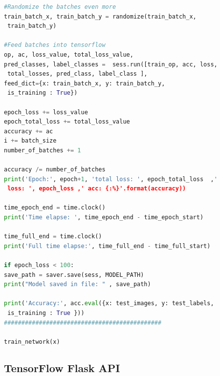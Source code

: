 \begin{lstlisting}[language=python, frame=single]
#Randomize the batches even more
train_batch_x, train_batch_y = randomize(train_batch_x,
 train_batch_y)

#Feed batches into tensorflow
op, ac, loss_value, total_loss_value, 
pred_classes, label_classes =  sess.run([train_op, acc, loss,
 total_losses, pred_class, label_class ],
feed_dict={x: train_batch_x, y: train_batch_y,
 is_training : True})

epoch_loss += loss_value
epoch_total_loss += total_loss_value
accuracy += ac
i += batch_size
number_of_batches += 1

accuracy /= number_of_batches       
print('Epoch:', epoch+1, 'total loss: ', epoch_total_loss  ,'
 loss: ', epoch_loss ,' acc: {:%}'.format(accuracy))

time_epoch_end = time.clock()
print('Time elapse: ', time_epoch_end - time_epoch_start)

time_full_end = time.clock()
print('Full time elapse:', time_full_end - time_full_start)

if epoch_loss < 100:
save_path = saver.save(sess, MODEL_PATH)
print("Model saved in file: " , save_path)

print('Accuracy:', acc.eval({x: test_images, y: test_labels,
 is_training : True }))
#############################################

train_network(x)
\end{lstlisting}


\subsection{TensorFlow Flask API}

